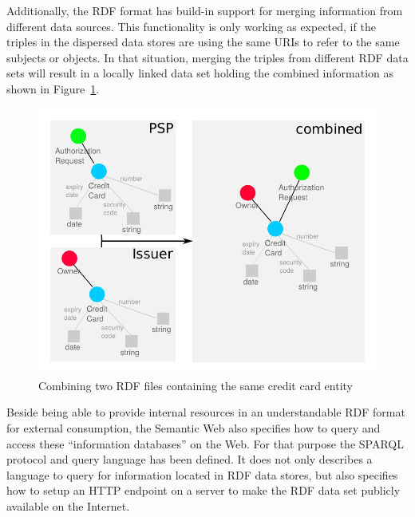 Additionally, the \gls{RDF} format has build-in support for merging information from different data sources. This functionality is only working as expected, if the triples in the dispersed data stores are using the same \gls{URI}s to refer to the same subjects or objects. In that situation, merging the triples from different \gls{RDF} data sets will result in a locally linked data set holding the combined information as shown in Figure~\ref{fig:images_combine_rdf_graph}. \@

\begin{figure}[H]
	\centering
		\includegraphics[width=0.9\columnwidth]{images/combine_rdf_graph.pdf}
	\caption{Combining two \gls{RDF} files containing the same credit card entity}
\label{fig:images_combine_rdf_graph}
\end{figure}

Beside being able to provide internal resources in an understandable \gls{RDF} format for external consumption, the Semantic Web also specifies how to query and access these ``information databases'' on the Web. For that purpose the \gls{SPARQL} protocol and query language has been defined. It does not only describes a language to query for information located in \gls{RDF} data stores, but also specifies how to setup an \gls{HTTP} endpoint on a server to make the \gls{RDF} data set publicly available on the Internet. \\

